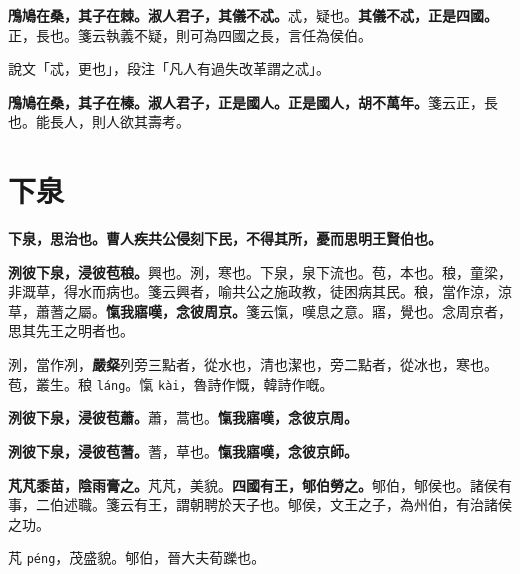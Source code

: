 \textbf{鳲鳩在桑，其子在棘。淑人君子，其儀不忒。}{\footnotesize 忒，疑也。}\textbf{其儀不忒，正是四國。}{\footnotesize 正，長也。箋云執義不疑，則可為四國之長，言任為侯伯。}

\begin{quoting}說文「忒，更也」，段注「凡人有過失改革謂之忒」。\end{quoting}

\textbf{鳲鳩在桑，其子在榛。淑人君子，正是國人。正是國人，胡不萬年。}{\footnotesize 箋云正，長也。能長人，則人欲其壽考。}

\section{下泉}


\textbf{下泉，思治也。曹人疾共公侵刻下民，不得其所，憂而思明王賢伯也。}

\textbf{洌彼下泉，浸彼苞稂。}{\footnotesize 興也。洌，寒也。下泉，泉下流也。苞，本也。稂，童梁，非溉草，得水而病也。箋云興者，喻共公之施政教，徒困病其民。稂，當作涼，涼草，蕭蓍之屬。}\textbf{愾我寤嘆，念彼周京。}{\footnotesize 箋云愾，嘆息之意。寤，覺也。念周京者，思其先王之明者也。}

\begin{quoting}洌，當作冽，\textbf{嚴粲}列旁三點者，從水也，清也潔也，旁二點者，從冰也，寒也。苞，叢生。稂 \texttt{láng}。愾 \texttt{kài}，魯詩作慨，韓詩作嘅。\end{quoting}

\textbf{洌彼下泉，浸彼苞蕭。}{\footnotesize 蕭，蒿也。}\textbf{愾我寤嘆，念彼京周。}

\textbf{洌彼下泉，浸彼苞蓍。}{\footnotesize 蓍，草也。}\textbf{愾我寤嘆，念彼京師。}

\textbf{芃芃黍苗，陰雨膏之。}{\footnotesize 芃芃，美貌。}\textbf{四國有王，郇伯勞之。}{\footnotesize 郇伯，郇侯也。諸侯有事，二伯述職。箋云有王，謂朝聘於天子也。郇侯，文王之子，為州伯，有治諸侯之功。}

\begin{quoting}芃 \texttt{péng}，茂盛貌。郇伯，晉大夫荀躒也。\end{quoting}

